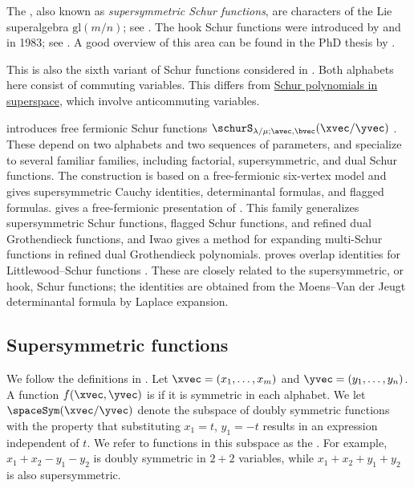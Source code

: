 The \label{hookSchurFunction}, also known as
\emph{supersymmetric Schur functions}, are characters of the Lie superalgebra
$\mathrm{gl}(m/n)$; see \cite{Kac1977}.
The hook Schur functions were introduced by  and
 in 1983; see \cite{BereleRegev1983}.
A good overview of this area can be found in the PhD thesis by
 \cite{Moens2007}.

This is also the sixth variant of Schur functions considered in
\cite[Eq.~6.19]{Macdonald1992}.
Both alphabets here consist of commuting variables. This differs from
\hyperref[schurSuperspace]{Schur polynomials in superspace},
which involve anticommuting variables.

 introduces free fermionic Schur functions
$\schurS_{\lambda/\mu;\avec,\bvec}(\xvec/\yvec)$
\cite{Naprienko2024}.  These depend on two alphabets and two sequences of
parameters, and specialize to several familiar families, including factorial,
supersymmetric, and dual Schur functions.  The construction is based on a
free-fermionic six-vertex model and gives supersymmetric Cauchy identities,
determinantal formulas, and flagged formulas.
 gives a free-fermionic presentation of
\label{multiSchurFunction} \cite{Iwao2023}.
This family generalizes
supersymmetric Schur functions, flagged Schur functions, and refined dual
Grothendieck functions, and Iwao gives a method for expanding multi-Schur
functions in refined dual Grothendieck polynomials.
 proves overlap identities for Littlewood--Schur
functions \cite{Riedtmann2018x}.  These are closely related to the
supersymmetric, or hook, Schur functions; the identities are obtained from
the Moens--Van der Jeugt determinantal formula by Laplace expansion.

\subsection[superSymmetricFunctions]{Supersymmetric functions}

We follow the definitions in \cite{MoensJeugt2003}.  Let
$\xvec = (x_1,\dotsc,x_m)$ and $\yvec = (y_1,\dotsc,y_n)$.
A function $f(\xvec,\yvec)$ is
\label{doublySymmetricFunction}
if it is symmetric in each alphabet.
We let $\spaceSym(\xvec/\yvec)$ denote the subspace of doubly symmetric functions
with the property that substituting $x_1=t$, $y_1=-t$ results in an
expression independent of $t$.
We refer to functions in this subspace as the
\label{supersymmetricFunction}.
For example, $x_1+x_2-y_1-y_2$ is doubly symmetric in $2+2$ variables,
while $x_1+x_2 + y_1 + y_2$ is also supersymmetric.



